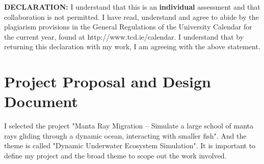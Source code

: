 \documentclass[a4paper, 10pt]{article}
\begin{document}

\begin{tcolorbox}[colback=light-blue]
\begin{small}
\textbf{DECLARATION:} I understand that this is an \textbf{individual} assessment and that collaboration is not permitted. I have read, understand and agree to abide by the plagiarism provisions in the
General Regulations of the University Calendar for the
current year, found at http://www.tcd.ie/calendar.
I understand that by returning this declaration with my work, I am agreeing with the above statement. 
\end{small}
\end{tcolorbox}

\bigskip



\section{Project Proposal and Design Document}
I selected the project "Manta Ray Migration – Simulate a large school of manta rays gliding through a dynamic ocean, interacting with smaller fish".
And the theme is called "Dynamic Underwater Ecosystem Simulation". It is important to define my project and the broad theme to scope out the work involved.
\end{document}
